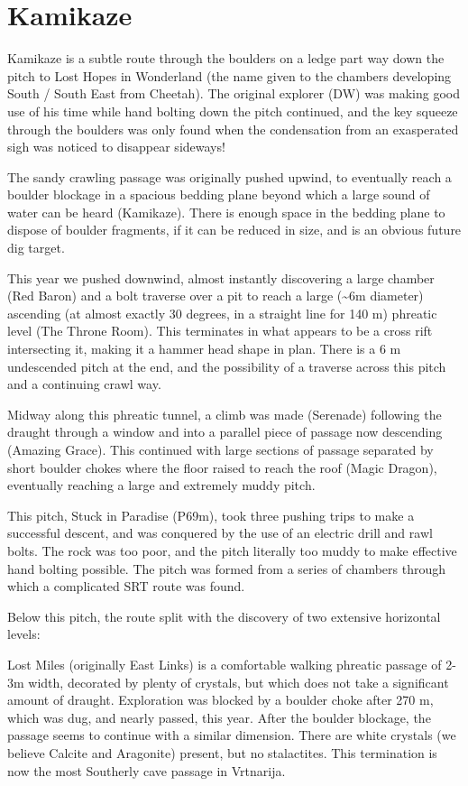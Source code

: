 \section{Kamikaze}

Kamikaze is a subtle route through the boulders on a ledge part way down
the pitch to Lost Hopes in Wonderland (the name given to the chambers
developing South / South East from Cheetah). The original explorer (DW)
was making good use of his time while hand bolting down the pitch
continued, and the key squeeze through the boulders was only found when
the condensation from an exasperated sigh was noticed to disappear
sideways!

The sandy crawling passage was originally pushed upwind, to eventually
reach a boulder blockage in a spacious bedding plane beyond which a
large sound of water can be heard (Kamikaze). There is enough space in
the bedding plane to dispose of boulder fragments, if it can be reduced
in size, and is an obvious future dig target.

This year we pushed downwind, almost instantly discovering a large
chamber (Red Baron) and a bolt traverse over a pit to reach a large
(\textasciitilde{}6m diameter) ascending (at almost exactly 30 degrees,
in a straight line for 140 m) phreatic level (The Throne Room). This
terminates in what appears to be a cross rift intersecting it, making it
a hammer head shape in plan. There is a 6 m undescended pitch at the
end, and the possibility of a traverse across this pitch and a
continuing crawl way.

Midway along this phreatic tunnel, a climb was made (Serenade) following
the draught through a window and into a parallel piece of passage now
descending (Amazing Grace). This continued with large sections of
passage separated by short boulder chokes where the floor raised to
reach the roof (Magic Dragon), eventually reaching a large and extremely
muddy pitch.

This pitch, Stuck in Paradise (P69m), took three pushing trips to make a
successful descent, and was conquered by the use of an electric drill
and rawl bolts. The rock was too poor, and the pitch literally too muddy
to make effective hand bolting possible. The pitch was formed from a
series of chambers through which a complicated SRT route was found.

Below this pitch, the route split with the discovery of two extensive
horizontal levels:

Lost Miles (originally East Links) is a comfortable walking phreatic
passage of 2-3m width, decorated by plenty of crystals, but which does
not take a significant amount of draught. Exploration was blocked by a
boulder choke after 270 m, which was dug, and nearly passed, this year.
After the boulder blockage, the passage seems to continue with a similar
dimension. There are white crystals (we believe Calcite and Aragonite)
present, but no stalactites. This termination is now the most Southerly
cave passage in Vrtnarija.

